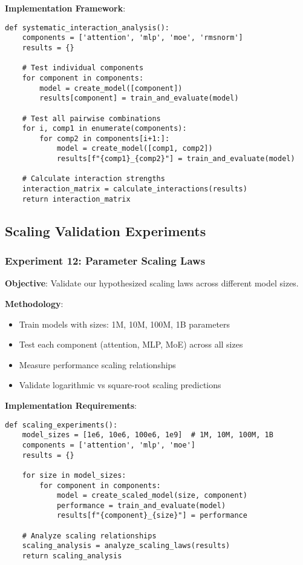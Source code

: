 \documentclass[11pt,a4paper]{article}
\begin{document}
\textbf{Implementation Framework}:
\begin{verbatim}
def systematic_interaction_analysis():
    components = ['attention', 'mlp', 'moe', 'rmsnorm']
    results = {}
    
    # Test individual components
    for component in components:
        model = create_model([component])
        results[component] = train_and_evaluate(model)
    
    # Test all pairwise combinations
    for i, comp1 in enumerate(components):
        for comp2 in components[i+1:]:
            model = create_model([comp1, comp2])
            results[f"{comp1}_{comp2}"] = train_and_evaluate(model)
    
    # Calculate interaction strengths
    interaction_matrix = calculate_interactions(results)
    return interaction_matrix
\end{verbatim}

\subsection{Scaling Validation Experiments}

\subsubsection{Experiment 12: Parameter Scaling Laws}
\textbf{Objective}: Validate our hypothesized scaling laws across different model sizes.

\textbf{Methodology}:
\begin{itemize}
    \item Train models with sizes: 1M, 10M, 100M, 1B parameters
    \item Test each component (attention, MLP, MoE) across all sizes
    \item Measure performance scaling relationships
    \item Validate logarithmic vs square-root scaling predictions
\end{itemize}

\textbf{Implementation Requirements}:
\begin{verbatim}
def scaling_experiments():
    model_sizes = [1e6, 10e6, 100e6, 1e9]  # 1M, 10M, 100M, 1B
    components = ['attention', 'mlp', 'moe']
    results = {}
    
    for size in model_sizes:
        for component in components:
            model = create_scaled_model(size, component)
            performance = train_and_evaluate(model)
            results[f"{component}_{size}"] = performance
    
    # Analyze scaling relationships
    scaling_analysis = analyze_scaling_laws(results)
    return scaling_analysis
\end{verbatim}
\end{document}
